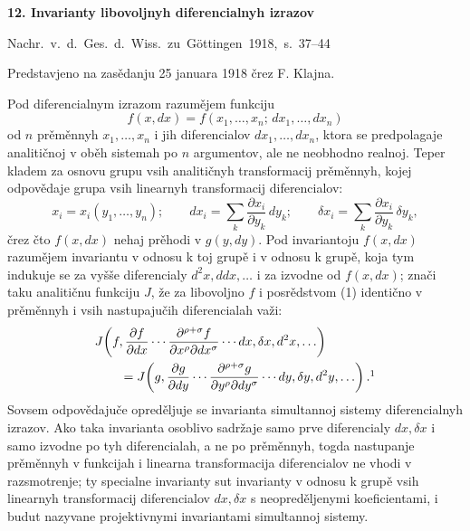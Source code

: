 \documentclass[11pt]{article}
\begin{document}

\begin{center}
{\Large\bfseries 12. Invarianty libovoljnyh diferencialnyh izrazov}\par
\vspace{1.5em}
\mbox{Nachr. v. d. Ges. d. Wiss. zu Göttingen 1918, s. 37--44}
\end{center}

\vspace{3em}
\begin{center}
Predstavjeno na zasědanju 25 januara 1918 črez F. Klajna.
\end{center}

Pod diferencialnym izrazom razumějem funkciju
\[
f(x,dx)=f(x_1,\ldots,x_n;\,dx_1,\ldots,dx_n)
\]
od \(n\) prěměnnyh \(x_1,\ldots,x_n\) i jih diferencialov
\(dx_1,\ldots,dx_n\), ktora se predpolagaje analitičnoj v oběh sistemah po \(n\) argumentov, ale ne neobhodno realnoj. Teper kladem za osnovu grupu vsih analitičnyh transformacij prěměnnyh, kojej odpovědaje grupa vsih linearnyh transformacij diferencialov:
\begin{equation}
x_i=x_i(y_1,\ldots,y_n);\qquad
dx_i=\sum_k\frac{\partial x_i}{\partial y_k}\,dy_k;\qquad
\delta x_i=\sum_k\frac{\partial x_i}{\partial y_k}\,\delta y_k,
\tag{1}
\end{equation}
črez čto \(f(x,dx)\) nehaj prěhodi v \(g(y,dy)\). Pod invariantoju \(f(x,dx)\) razumějem invariantu v odnosu k toj grupě i v odnosu k grupě, koja tym indukuje se za vyšše diferencialy \(d^2x,ddx,\ldots\) i za izvodne od \(f(x,dx)\); znači taku analitičnu funkciju \(J\), že za libovoljno \(f\) i posrědstvom (1) identično v prěměnnyh i vsih nastupajučih diferencialah važi:
\[
\begin{aligned}
&J\!\left(f,\frac{\partial f}{\partial dx}\cdots
\frac{\partial^{\rho+\sigma}f}{\partial x^\rho\partial dx^\sigma}
\cdots dx,\delta x,d^2x,\ldots\right)\\
&\qquad =
J\!\left(g,\frac{\partial g}{\partial dy}\cdots
\frac{\partial^{\rho+\sigma}g}{\partial y^\rho\partial dy^\sigma}
\cdots dy,\delta y,d^2y,\ldots\right).\footnotemark
\end{aligned}
\]
Sovsem odpovědajuče opreděljuje se invarianta simultannoj sistemy diferencialnyh izrazov. Ako taka invarianta osoblivo sadržaje samo prve diferencialy \(dx,\delta x\) i samo izvodne po tyh diferencialah, a ne po prěměnnyh, togda nastupanje prěměnnyh v funkcijah i linearna transformacija diferencialov ne vhodi v razsmotrenje; ty specialne invarianty sut invarianty v odnosu k grupě vsih linearnyh transformacij diferencialov \(dx,\delta x\) s neopreděljenymi koeficientami, i budut nazyvane projektivnymi invariantami simultannoj sistemy.
\end{document}
